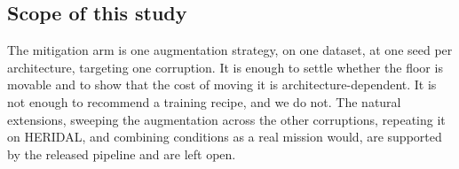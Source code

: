 \subsection{Scope of this study}

The mitigation arm is one augmentation strategy, on one dataset, at one
seed per architecture, targeting one corruption. It is enough to settle
whether the floor is movable and to show that the cost of moving it is
architecture-dependent. It is not enough to recommend a training recipe,
and we do not. The natural extensions, sweeping the augmentation across
the other corruptions, repeating it on HERIDAL, and combining
conditions as a real mission would, are supported by the released
pipeline and are left open.
